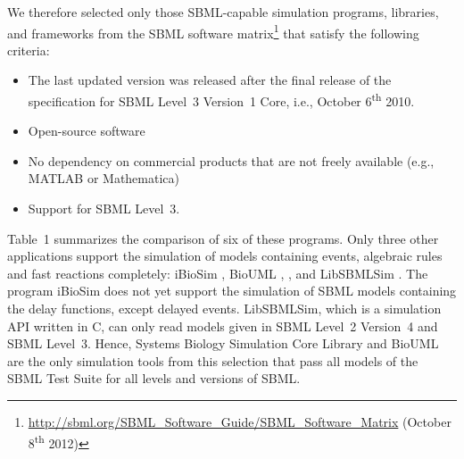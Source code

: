 \documentclass[10pt]{bmc_article}
\newenvironment{bmcformat}{\baselineskip20pt\sloppy\setboolean{publ}{false}}{\baselineskip20pt\sloppy}
\newcommand{\TODO}[1]{\textcolor{red}{\textbf{#1}}}
\begin{document}
\begin{bmcformat}
We therefore selected only those SBML-capable simulation programs, libraries,
and frameworks from the SBML software
matrix\footnote{\url{http://sbml.org/SBML_Software_Guide/SBML_Software_Matrix} (October 8\textsuperscript{th} 2012)}
that satisfy the following criteria:
\begin{itemize}
  \item The last updated version was released after the final release of
  the specification for SBML Level~3 Version~1 Core, i.e., October
  6\textsuperscript{th} 2010.
  \item Open-source software
  \item No dependency on commercial products that are not freely available
  (e.g., MATLAB\texttrademark{} or Mathematica\texttrademark)
  \item Support for SBML Level~3. 
\end{itemize}
Table~1 summarizes the comparison of six of these programs.
Only three other applications support the simulation of models containing events, algebraic rules and fast reactions completely:
iBioSim \cite{Myers2009}, BioUML \cite{Kolpakov2011}, \cite{Kolpakov2006}, and LibSBMLSim \cite{Funahashi2012}.
The program iBioSim does not yet support the simulation of SBML models
containing the delay functions, except delayed events.
LibSBMLSim, which is a simulation API written in C, can only read models given
in SBML Level~2 Version~4 and SBML Level~3.
Hence, Systems Biology Simulation Core Library and BioUML are the only
simulation tools from this selection that pass all models of the SBML Test Suite
for all levels and versions of SBML.


\end{bmcformat}
\end{document}
